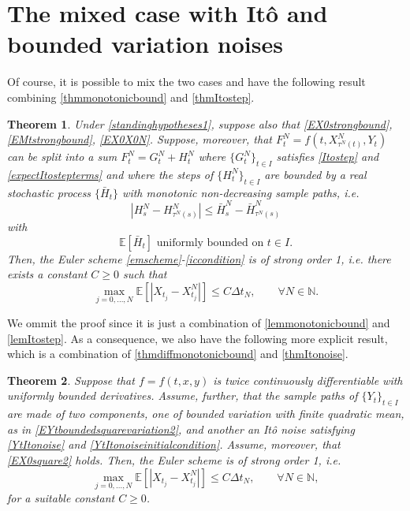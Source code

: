 \documentclass[reqno,12pt]{amsart}
\theoremstyle{plain}%
\newtheorem{thm}{Theorem}[section]
\theoremstyle{definition}
\begin{document}
\section{The mixed case with It\^o and bounded variation noises}
\label{secmixed}

Of course, it is possible to mix the two cases and have the following result combining \cref{thmmonotonicbound} and \cref{thmItostep}.

\begin{thm}
    \label{thmmixedcase}
    Under \cref{standinghypotheses1}, suppose also that
    \eqref{EX0strongbound}, \eqref{EMtstrongbound}, \eqref{EX0X0N}. Suppose, moreover, that $F_t^N = f(t, X_{\tau^N(t)}^N, Y_t)$ can be split into a sum $F_t^N = G_t^N + H_t^N$ where $\{G_t^N\}_{t\in I}$ satisfies \eqref{Itostep} and \eqref{expectItostepterms} and where the steps of $\{H_t^N\}_{t\in I}$ are bounded by a real stochastic process $\{\bar H_t\}$ with monotonic non-decreasing sample paths, i.e.
    \begin{equation}
        \label{stepHbound}
        |H_s^N - H_{\tau^N(s)}^N| \leq \bar H_s^N - \bar H_{\tau^N(s)}^N
    \end{equation}
    with
    \begin{equation}
      \label{expectstepHmonotonic}
      \mathbb{E}[\bar H_t] \textrm{ uniformly bounded on } t\in I.
    \end{equation}
    Then, the Euler scheme \eqref{emscheme}-\eqref{iccondition} is of strong order 1, i.e. there exists a constant $C\geq 0$ such that
    \begin{equation}
      \label{thmmixedtrongordernew}
        \max_{j=0, \ldots, N}\mathbb{E}\left[ \left| X_{t_j} - X_{t_j}^N \right| \right] \leq C \Delta t_N, \qquad \forall N \in \mathbb{N}.
    \end{equation}
\end{thm}

We ommit the proof since it is just a combination of \cref{lemmonotonicbound} and \cref{lemItostep}. As a consequence, we also have the following more explicit result, which is a combination of \cref{thmdiffmonotonicbound} and \cref{thmItonoise}.

\begin{thm}
    \label{thmmixedcasepractical}
    Suppose that $f=f(t, x, y)$ is twice continuously differentiable with uniformly bounded derivatives. Assume, further, that the sample paths of $\{Y_t\}_{t\in I}$ are made of two components, one of bounded variation with finite quadratic mean, as in \eqref{EYtboundedsquarevariation2}, and another an It\^o noise satisfying \eqref{YtItonoise} and \eqref{YtItonoiseinitialcondition}. Assume, moreover, that \eqref{EX0square2} holds. Then, the Euler scheme is of strong order 1, i.e.
    \begin{equation}
        \max_{j=0, \ldots, N}\mathbb{E}\left[ \left| X_{t_j} - X_{t_j}^N \right| \right] \leq C \Delta t_N, \qquad \forall N \in \mathbb{N},
    \end{equation}
    for a suitable constant $C \geq 0$.
\end{thm}
\end{document}
